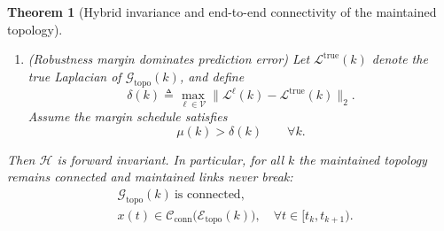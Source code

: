 \documentclass[conference]{IEEEconf}
\theoremstyle{plain}
\newtheorem{theorem}{Theorem} %
\begin{document}
\begin{theorem}[Hybrid invariance and end-to-end connectivity of the maintained topology]
\begin{enumerate}
\item (\emph{Robustness margin dominates prediction error})
Let $\mathcal{L}^{\mathrm{true}}(k)$ denote the true Laplacian of $\mathcal{G}_{\mathrm{topo}}(k)$, and define
\[
\delta(k)\triangleq \max_{\ell\in\mathcal{V}}\big\|\mathcal{L}^{\ell}(k)-\mathcal{L}^{\mathrm{true}}(k)\big\|_2 .
\]
Assume the margin schedule satisfies
\begin{equation}
\mu(k)>\delta(k)\qquad \forall k .
\label{eq:mu_gt_delta}
\end{equation}
\end{enumerate}

Then $\mathcal{H}$ is forward invariant. In particular, for all $k$ the maintained topology remains connected and maintained
links never break:
\begin{equation}
\begin{aligned}
&\mathcal{G}_{\mathrm{topo}}(k)\ \text{is connected},\\
&x(t)\in\mathcal{C}_{\mathrm{conn}}\!\big(\mathcal{E}_{\mathrm{topo}}(k)\big),
\quad \forall t\in[t_k,t_{k+1}).
\end{aligned}
\label{eq:conn_and_feas}
\end{equation}
\end{theorem}
\end{document}

